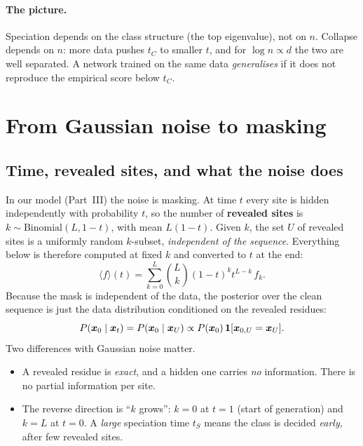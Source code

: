 \paragraph{The picture.} Speciation depends on the class structure (the top eigenvalue), not on $n$. Collapse
depends on $n$: more data pushes $t_C$ to smaller $t$, and for $\log n\propto d$ the two are well separated. A
network trained on the same data \emph{generalises} if it does not reproduce the empirical score below $t_C$.

\section{From Gaussian noise to masking}\label{sec:dr_mask}
\subsection{Time, revealed sites, and what the noise does}
In our model (Part~III) the noise is masking. At time $t$ every site is hidden independently with probability $t$,
so the number of \textbf{revealed sites} is $k\sim\mathrm{Binomial}(L,1-t)$, with mean $L(1-t)$. Given $k$, the set
$U$ of revealed sites is a uniformly random $k$-subset, \emph{independent of the sequence}. Everything below is
therefore computed at fixed $k$ and converted to $t$ at the end:
\begin{equation}\label{eq:k_to_t}
\langle f\rangle(t)=\sum_{k=0}^L\binom Lk(1-t)^kt^{L-k}\,f_k .
\end{equation}
Because the mask is independent of the data, the posterior over the clean sequence is just the data distribution
conditioned on the revealed residues:
\begin{equation}\label{eq:mask_posterior}
P(\bm x_0\mid\bm x_t)=P(\bm x_0\mid \bm x_U)\propto P(\bm x_0)\,\mathbf{1}[\bm x_{0,U}=\bm x_U].
\end{equation}
Two differences with Gaussian noise matter.
\begin{itemize}[nosep]
\item A revealed residue is \emph{exact}, and a hidden one carries \emph{no} information. There is no partial
information per site.
\item The reverse direction is ``$k$ grows'': $k=0$ at $t=1$ (start of generation) and $k=L$ at $t=0$. A
\emph{large} speciation time $t_S$ means the class is decided \emph{early}, after few revealed sites.
\end{itemize}

